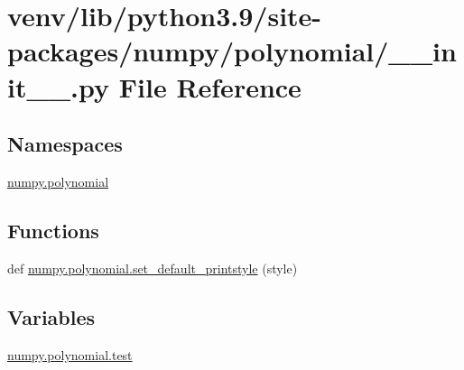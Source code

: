 \hypertarget{venv_2lib_2python3_89_2site-packages_2numpy_2polynomial_2____init_____8py}{}\section{venv/lib/python3.9/site-\/packages/numpy/polynomial/\+\_\+\+\_\+init\+\_\+\+\_\+.py File Reference}
\label{venv_2lib_2python3_89_2site-packages_2numpy_2polynomial_2____init_____8py}
\subsection*{Namespaces}
\begin{DoxyCompactItemize}
\item 
 \hyperlink{namespacenumpy_1_1polynomial}{numpy.\+polynomial}
\end{DoxyCompactItemize}
\subsection*{Functions}
\begin{DoxyCompactItemize}
\item 
def \hyperlink{namespacenumpy_1_1polynomial_a72683cf4fec4df5aaca959cdbab278a0}{numpy.\+polynomial.\+set\+\_\+default\+\_\+printstyle} (style)
\end{DoxyCompactItemize}
\subsection*{Variables}
\begin{DoxyCompactItemize}
\item 
\hyperlink{namespacenumpy_1_1polynomial_ab69cac4b8a52e2993a7792c06ba62e77}{numpy.\+polynomial.\+test}
\end{DoxyCompactItemize}

